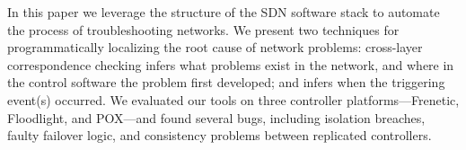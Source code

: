 In this paper we leverage the
structure of the SDN software stack to automate the process of troubleshooting
networks. We present two techniques for programmatically localizing the root cause of network problems:
cross-layer correspondence checking infers what problems exist in the network, 
and where in the control software the problem first developed; and
\simulator{} infers when the triggering event(s) occurred. We evaluated
our tools on
three controller platforms---Frenetic, Floodlight, and POX---and found several bugs,
including isolation breaches,
faulty failover logic, and consistency problems between replicated
controllers.
